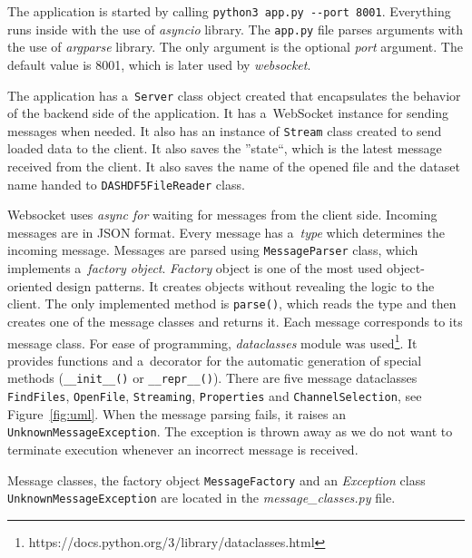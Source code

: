 The application is started by calling \verb|python3 app.py --port 8001|. Everything runs inside with the use of \textit{asyncio} library. The \texttt{app.py} file parses arguments with the use of \textit{argparse} library. The only argument is the optional \textit{port} argument. The default value is 8001, which is later used by \textit{websocket}. 

The application has a~\texttt{Server} class object created that encapsulates the behavior of the backend side of the application. It has a~WebSocket instance for sending messages when needed. It also has an instance of \texttt{Stream} class created to send loaded data to the client. It also saves the ''state``, which is the latest message received from the client. It also saves the name of the opened file and the dataset name handed to \texttt{DASHDF5FileReader} class.


Websocket uses \textit{async for} waiting for messages from the client side. Incoming messages are in JSON format. Every message has a~\textit{type} which determines the incoming message. Messages are parsed using \texttt{MessageParser} class, which implements a~\textit{factory object}.
\textit{Factory} object is one of the most used object-oriented design patterns. It creates objects without revealing the logic to the client. The only implemented method is \texttt{parse()}, which reads the type and then creates one of the message classes and returns it. Each message corresponds to its message class. For ease of programming, \textit{dataclasses} module was used\footnote{https://docs.python.org/3/library/dataclasses.html}. It provides functions and a~decorator for the automatic generation of special methods (\verb|__init__()| or \verb|__repr__()|). There are five message dataclasses \texttt{FindFiles}, \texttt{OpenFile}, \texttt{Streaming}, \texttt{Properties} and \texttt{ChannelSelection}, see Figure~\ref{fig:uml}. When the message parsing fails, it raises an \texttt{UnknownMessageException}. The exception is thrown away as we do not want to terminate execution whenever an incorrect message is received.

Message classes, the factory object \texttt{MessageFactory} and an \textit{Exception} class \texttt{UnknownMessageException} are located in the \textit{message\_classes.py} file.

